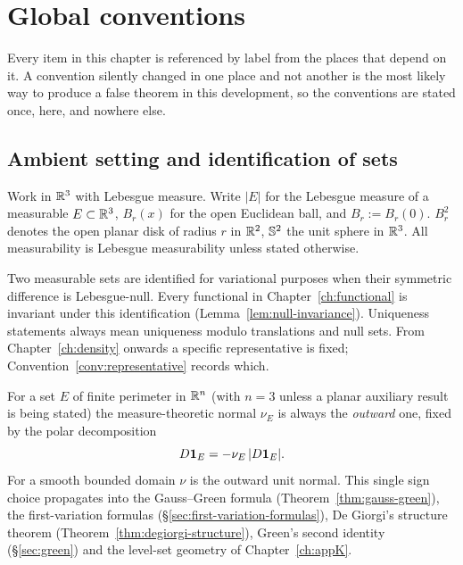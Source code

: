 \chapter{Global conventions}\label{ch:conventions}

Every item in this chapter is referenced by label from the places that depend
on it.  A convention silently changed in one place and not another is the
most likely way to produce a false theorem in this development, so the
conventions are stated once, here, and nowhere else.

\section{Ambient setting and identification of sets}

\begin{convention}\label{conv:ambient}
Work in $\mathbb R^3$ with Lebesgue measure.  Write $|E|$ for the Lebesgue measure
of a measurable $E\subset\mathbb R^3$, $B_r(x)$ for the open Euclidean ball, and
$B_r:=B_r(0)$.  $B_r^2$ denotes the open planar disk of radius $r$ in $\mathbb R^2$,
$\mathbb S^2$ the unit sphere in $\mathbb R^3$.  All measurability is Lebesgue
measurability unless stated otherwise.
\end{convention}

\begin{convention}\label{conv:null}
Two measurable sets are identified for variational purposes when their
symmetric difference is Lebesgue-null.  Every functional in
Chapter~\ref{ch:functional} is invariant under this identification
(Lemma~\ref{lem:null-invariance}).  Uniqueness statements always mean
uniqueness modulo translations and null sets.  From
Chapter~\ref{ch:density} onwards a specific representative is fixed;
Convention~\ref{conv:representative} records which.
\end{convention}

\begin{convention}\label{conv:outward}
For a set $E$ of finite perimeter in $\mathbb R^n$ (with $n=3$ unless a planar
auxiliary result is being stated) the measure-theoretic normal $\nu_E$ is
always the \emph{outward} one, fixed by the polar decomposition
\[
  D\mathbf 1_{E}=-\nu_E\,|D\mathbf 1_{E}| .
\]
For a smooth bounded domain $\nu$ is the outward unit normal.  This single
sign choice propagates into the Gauss--Green formula
(Theorem~\ref{thm:gauss-green}), the first-variation formulas
(\S\ref{sec:first-variation-formulas}), De Giorgi's structure theorem
(Theorem~\ref{thm:degiorgi-structure}), Green's second identity
(\S\ref{sec:green}) and the level-set geometry of Chapter~\ref{ch:appK}.
\end{convention}

